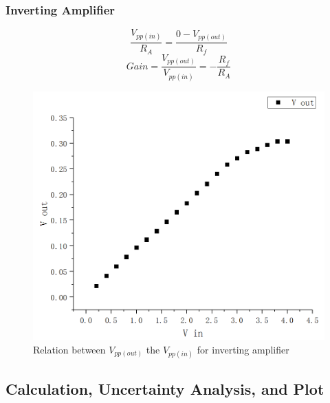 \documentclass[12pt]{article}
\begin{document}
\subsubsection{Inverting Amplifier}
$$\frac{V_{pp(in)}}{R_A}=\frac{0-V_{pp(out)}}{R_f}$$
$$Gain=\frac{V_{pp(out)}}{V_{pp(in)}}=-\frac{R_f}{R_A}$$
\begin{figure}[H]
\centering
\includegraphics[scale=0.3]{P8.jpg}
\caption{Relation between $V_{pp(out)}$ the $V_{pp(in)}$ for inverting amplifier}
\end{figure}
\subsection{Calculation, Uncertainty Analysis, and Plot}
\end{document}
